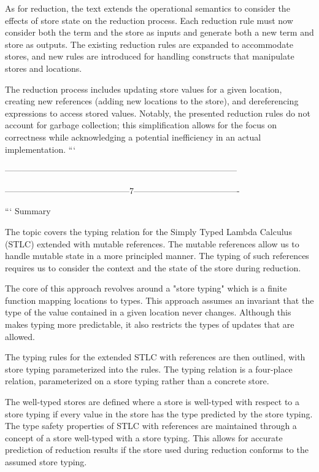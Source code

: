 As for reduction, the text extends the operational semantics to consider the effects of store state on the reduction process. Each reduction rule must now consider both the term and the store as inputs and generate both a new term and store as outputs. The existing reduction rules are expanded to accommodate stores, and new rules are introduced for handling constructs that manipulate stores and locations.

The reduction process includes updating store values for a given location, creating new references (adding new locations to the store), and dereferencing expressions to access stored values. Notably, the presented reduction rules do not account for garbage collection; this simplification allows for the focus on correctness while acknowledging a potential inefficiency in an actual implementation.
```

---------------------------------------------------------------------------------


--------------------------------------------7-------------------------------------

```
Summary

The topic covers the typing relation for the Simply Typed Lambda Calculus (STLC) extended with mutable references. The mutable references allow us to handle mutable state in a more principled manner. The typing of such references requires us to consider the context and the state of the store during reduction.

The core of this approach revolves around a "store typing" which is a finite function mapping locations to types. This approach assumes an invariant that the type of the value contained in a given location never changes. Although this makes typing more predictable, it also restricts the types of updates that are allowed.

The typing rules for the extended STLC with references are then outlined, with store typing parameterized into the rules. The typing relation is a four-place relation, parameterized on a store typing rather than a concrete store.

The well-typed stores are defined where a store is well-typed with respect to a store typing if every value in the store has the type predicted by the store typing. The type safety properties of STLC with references are maintained through a concept of a store well-typed with a store typing. This allows for accurate prediction of reduction results if the store used during reduction conforms to the assumed store typing.

